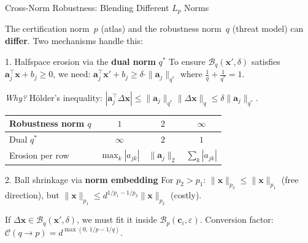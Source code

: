 \documentclass[aspectratio=169, 10pt]{beamer}
\newcommand{\vx}{\mathbf{x}}
\newcommand{\va}{\mathbf{a}}
\newcommand{\vc}{\mathbf{c}}
\newcommand{\Bp}{\mathcal{B}_p}
\newcommand{\Bq}{\mathcal{B}_q}
\begin{document}
\begin{frame}{Cross-Norm Robustness: Blending Different $L_p$ Norms}

The certification norm~$p$ (atlas) and the robustness norm~$q$ (threat model) can \textbf{differ}. Two mechanisms handle this:

\begin{block}{1. Halfspace erosion via the \textbf{dual norm} $q^*$}
\vspace{-6pt}
To ensure $\Bq(\vx', \delta)$ satisfies $\va_j^\top \vx + b_j \geq 0$, we need:
$\va_j^\top \vx' + b_j \geq \delta \cdot \|\va_j\|_{q^*}$
where $\tfrac{1}{q} + \tfrac{1}{q^*} = 1$.

\smallskip
\emph{Why?} H\"older's inequality: $|\va_j^\top \Delta\vx| \leq \|\va_j\|_{q^*}\|\Delta\vx\|_q \leq \delta\|\va_j\|_{q^*}$.

\smallskip
{\small\begin{tabular}{lccc}
  \toprule
  Robustness norm $q$ & $1$ & $2$ & $\infty$ \\
  \midrule
  Dual $q^*$ & $\infty$ & $2$ & $1$ \\
  Erosion per row & $\max_k|a_{jk}|$ & $\|\va_j\|_2$ & $\sum_k|a_{jk}|$ \\
  \bottomrule
\end{tabular}}
\end{block}

\begin{block}{2. Ball shrinkage via \textbf{norm embedding}}
\vspace{-6pt}
For $p_2 > p_1$: \; $\|\vx\|_{p_2} \leq \|\vx\|_{p_1}$ (free direction), \; but \; $\|\vx\|_{p_1} \leq d^{1/p_1 - 1/p_2}\|\vx\|_{p_2}$ (costly).

\smallskip
If $\Delta\vx \in \Bq(\vx', \delta)$, we must fit it inside $\Bp(\vc_i, \varepsilon)$.
Conversion factor: $\mathcal{C}(q\!\to\!p) = d^{\max(0,\,1/p - 1/q)}$.
\end{block}

\end{frame}
\end{document}
